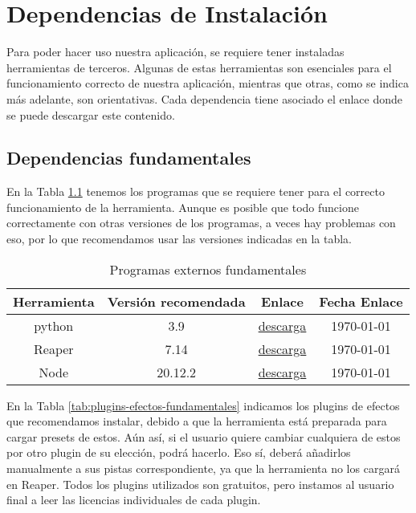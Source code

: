 \chapter{Dependencias de Instalación}
\label{Appendix:Key1}

Para poder hacer uso nuestra aplicación, se requiere tener instaladas herramientas de terceros. Algunas de estas herramientas son esenciales para el funcionamiento correcto de nuestra aplicación, mientras que otras, como se indica más adelante, son orientativas.
Cada dependencia tiene asociado el enlace donde se puede descargar este contenido.

\section{Dependencias fundamentales}

En la Tabla \ref{tab:programas-externos} tenemos los programas que se requiere tener para el correcto funcionamiento de la herramienta. Aunque es posible que todo funcione correctamente con otras versiones de los programas, a veces hay problemas con eso, por lo que recomendamos usar las versiones indicadas en la tabla.

\begin{table}[h]
    \centering
	\begin{tabular}{c|c|c|c}
		\textbf{Herramienta} & \textbf{Versión recomendada} & \textbf{Enlace} & \textbf{Fecha Enlace} \\
		\hline\hline
		python & 3.9 & \href{https://www.python.org/downloads/release/python-390/}{descarga} & \today\\
		Reaper & 7.14 & \href{https://www.reaper.fm/download.php}{descarga} & \today\\
		Node & 20.12.2 & \href{https://nodejs.org/en/download}{descarga} & \today\\
		\hline
	\end{tabular}
	\caption{Programas externos fundamentales}
	\label{tab:programas-externos}
\end{table}

En la Tabla \ref{tab:plugins-efectos-fundamentales} indicamos los plugins de efectos que recomendamos instalar, debido a que la herramienta está preparada para cargar presets de estos. Aún así, si el usuario quiere cambiar cualquiera de estos por otro plugin de su elección, podrá hacerlo. Eso sí, deberá añadirlos manualmente a sus pistas correspondiente, ya que la herramienta no los cargará en Reaper. Todos los plugins utilizados son gratuitos, pero instamos al usuario final a leer las licencias individuales de cada plugin.


